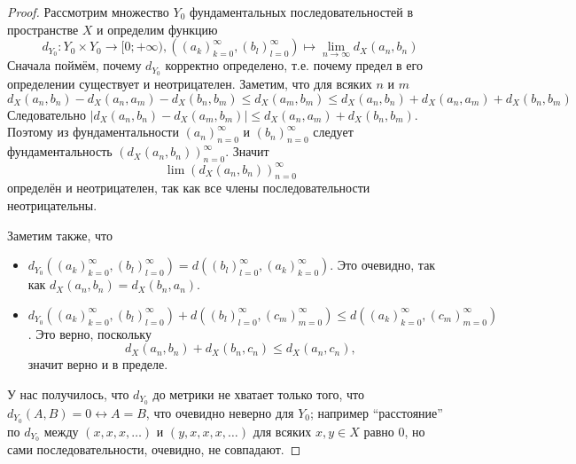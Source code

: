 \documentclass[12pt,a4paper]{article}
\begin{document}
    \begin{proof}
        Рассмотрим множество $Y_0$ фундаментальных последовательностей в пространстве $X$ и определим функцию
        \[d_{Y_0}: Y_0 \times Y_0 \to [0; + \infty), ((a_k)_{k=0}^\infty, (b_l)_{l=0}^\infty) \mapsto \lim_{n \to \infty} d_X(a_n, b_n)\]
        Сначала поймём, почему $d_{Y_0}$ корректно определено, т.е. почему предел в его определении существует и неотрицателен. Заметим, что для всяких $n$ и $m$
        \[d_X(a_n, b_n) - d_X(a_n, a_m) - d_X(b_n, b_m) \leqslant d_X(a_m, b_m) \leqslant d_X(a_n, b_n) + d_X(a_n, a_m) + d_X(b_n, b_m)\]
        Следовательно $|d_X(a_n, b_n) - d_X(a_m, b_m)| \leqslant d_X(a_n, a_m) + d_X(b_n, b_m)$. Поэтому из фундаментальности $(a_n)_{n=0}^\infty$ и $(b_n)_{n=0}^\infty$ следует фундаментальность $(d_X(a_n, b_n))_{n=0}^\infty$. Значит
        \[\lim (d_X(a_n, b_n))_{n=0}^\infty\]
        определён и неотрицателен, так как все члены последовательности неотрицательны.

        Заметим также, что
        \begin{itemize}
            \item $d_{Y_0}((a_k)_{k=0}^\infty, (b_l)_{l=0}^\infty) = d((b_l)_{l=0}^\infty, (a_k)_{k=0}^\infty)$. Это очевидно, так как $d_X(a_n, b_n) = d_X(b_n, a_n)$.
            \item $d_{Y_0}((a_k)_{k=0}^\infty, (b_l)_{l=0}^\infty) + d((b_l)_{l=0}^\infty, (c_m)_{m=0}^\infty) \leqslant d((a_k)_{k=0}^\infty, (c_m)_{m=0}^\infty)$. Это верно, поскольку
            \[d_X(a_n, b_n) + d_X(b_n, c_n) \leqslant d_X(a_n, c_n),\]
            значит верно и в пределе.
        \end{itemize}

        У нас получилось, что $d_{Y_0}$ до метрики не хватает только того, что $d_{Y_0}(A, B) = 0 \leftrightarrow A = B$, что очевидно неверно для $Y_0$; например ``расстояние'' по $d_{Y_0}$ между $(x, x, x, \dots)$ и $(y, x, x, x, \dots)$ для всяких $x, y \in X$ равно $0$, но сами последовательности, очевидно, не совпадают.


\end{proof}
\end{document}
